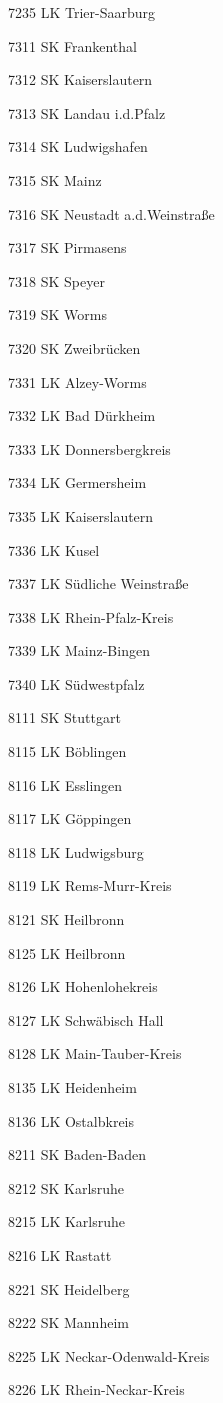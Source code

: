 7235  LK Trier-Saarburg

7311  SK Frankenthal

7312  SK Kaiserslautern

7313  SK Landau i.d.Pfalz

7314  SK Ludwigshafen

7315  SK Mainz

7316  SK Neustadt a.d.Weinstraße

7317  SK Pirmasens

7318  SK Speyer

7319  SK Worms

7320  SK Zweibrücken

7331  LK Alzey-Worms

7332  LK Bad Dürkheim

7333  LK Donnersbergkreis

7334  LK Germersheim

7335  LK Kaiserslautern

7336  LK Kusel

7337  LK Südliche Weinstraße

7338  LK Rhein-Pfalz-Kreis

7339  LK Mainz-Bingen

7340  LK Südwestpfalz

8111  SK Stuttgart

8115  LK Böblingen

8116  LK Esslingen

8117  LK Göppingen

8118  LK Ludwigsburg

8119  LK Rems-Murr-Kreis

8121  SK Heilbronn

8125  LK Heilbronn

8126  LK Hohenlohekreis

8127  LK Schwäbisch Hall

8128  LK Main-Tauber-Kreis

8135  LK Heidenheim

8136  LK Ostalbkreis

8211  SK Baden-Baden

8212  SK Karlsruhe

8215  LK Karlsruhe

8216  LK Rastatt

8221  SK Heidelberg

8222  SK Mannheim

8225  LK Neckar-Odenwald-Kreis

8226  LK Rhein-Neckar-Kreis

